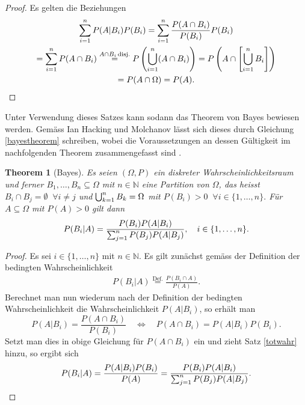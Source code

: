 \documentclass[a4paper,11pt]{article}
\numberwithin{equation}{section}
\newtheorem{tnplus}{Theorem}[subsection]
\begin{document}
\begin{proof}
	Es gelten die Beziehungen \begin{gather}
		\sum_{i=1}^{n}P(A|B_i)P(B_i) = \sum_{i=1}^{n}\frac{P(A \cap B_i)}{P(B_i)}P(B_i) \nonumber \\ =\sum_{i=1}^{n} P(A \cap B_i) \overset{A \cap B_i \,\mathrm{disj.}}{=} P\left(\bigcup\displaylimits_{i=1}^{n}(A \cap B_i)\right) = P\left(A \cap \left[\bigcup\displaylimits_{i=1}^{n}B_i\right]\right) \nonumber \\ = P(A \cap \Omega) = P(A). \nonumber
	\end{gather}
\end{proof}
Unter Verwendung dieses Satzes kann sodann das Theorem von Bayes bewiesen werden. Gemäss Ian Hacking und Molchanov lässt sich dieses durch Gleichung \eqref{bayestheorem} schreiben, wobei die Voraussetzungen an dessen Gültigkeit im nachfolgenden Theorem zusammengefasst sind \cite[S. 69-71, S. 19]{Hacking.2001, Molchanov.2017}.
\begin{tnplus}[Bayes]
	Es seien $(\Omega, P)$ ein diskreter Wahrscheinlichkeitsraum und ferner $B_1,\dots,B_n \subseteq \Omega$ mit $n \in \mathbb{N}$ eine Partition von $\Omega$, das heisst $B_i \cap B_j = \emptyset \;\; \forall i \neq j$ und $\bigcup\displaylimits_{k=1}^{n}B_k = \Omega$ mit $P(B_i) > 0 \;\; \forall i \in \{1,\dots,n\}.$ Für $A \subseteq \Omega$ mit $P(A) > 0$ gilt dann \begin{equation}\label{bayestheorem}
		P(B_i|A) = \frac{P(B_i)P(A|B_i)}{\sum\displaylimits_{j=1}^{n}P(B_j)P(A|B_j)},\quad i \in \{1,\dots,n\}.
	\end{equation}
\end{tnplus}
\begin{proof} Es sei $i \in \{1,\dots,n\}$ mit $n \in \mathbb{N}.$ Es gilt zunächst gemäss der Definition der bedingten Wahrscheinlichkeit
	\begin{gather}\nonumber
		P(B_i|A) \overset{\mathrm{Def.}}{=} \frac{P(B_i \cap A)}{P(A)}.
	\end{gather} Berechnet man nun wiederum nach der Definition der bedingten Wahrscheinlichkeit die Wahrscheinlichkeit $P(A|B_i)$, so erhält man $$ P(A|B_i) = \frac{P(A \cap B_i)}{P(B_i)} \quad \Leftrightarrow \quad P(A \cap B_i) = P(A|B_i)P(B_i).$$ Setzt man dies in obige Gleichung für $P(A \cap B_i)$ ein und zieht Satz \ref{totwahr} hinzu, so ergibt sich \begin{gather}\nonumber
	P(B_i|A) = \frac{P(A|B_i)P(B_i)}{P(A)} = \frac{P(B_i)P(A|B_i)}{\sum\displaylimits_{j=1}^{n}P(B_j)P(A|B_j)}.
\end{gather}
\end{proof}
\end{document}
